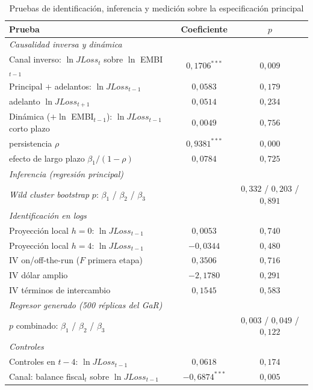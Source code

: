 \begin{table}[htbp]
\centering
\footnotesize
\caption[Pruebas de identificación, inferencia y medición]{Pruebas de identificación, inferencia y medición sobre la especificación principal}
\label{tab:arbitro}
\begin{tabular}{lcc}
\toprule
Prueba & Coeficiente & $p$ \\
\midrule
\multicolumn{3}{l}{\textit{Causalidad inversa y dinámica}} \\
Canal inverso: $\ln JLoss_t$ sobre $\ln$ EMBI$_{t-1}$ & $0{,}1706^{***}$ & $0{,}009$ \\
Principal $+$ adelantos: $\ln JLoss_{t-1}$ & $0{,}0583$ & $0{,}179$ \\
\quad adelanto $\ln JLoss_{t+1}$ & $0{,}0514$ & $0{,}234$ \\
Dinámica ($+\ln$ EMBI$_{t-1}$): $\ln JLoss_{t-1}$ corto plazo & $0{,}0049$ & $0{,}756$ \\
\quad persistencia $\rho$ & $0{,}9381^{***}$ & $0{,}000$ \\
\quad efecto de largo plazo $\beta_1/(1-\rho)$ & $0{,}0784$ & $0{,}725$ \\
\multicolumn{3}{l}{\textit{Inferencia (regresión principal)}} \\
\textit{Wild cluster bootstrap} $p$: $\beta_1$ / $\beta_2$ / $\beta_3$ & & $0{,}332$ / $0{,}203$ / $0{,}891$ \\
\multicolumn{3}{l}{\textit{Identificación en logs}} \\
Proyección local $h=0$: $\ln JLoss_{t-1}$ & $0{,}0053$ & $0{,}740$ \\
Proyección local $h=4$: $\ln JLoss_{t-1}$ & $-0{,}0344$ & $0{,}480$ \\
IV on/off-the-run ($F$ primera etapa) & $0{,}3506$ \;[$F=9{,}4$] & $0{,}716$ \\
IV dólar amplio & $-2{,}1780$ \;[$F=11{,}0$] & $0{,}291$ \\
IV términos de intercambio & $0{,}1545$ \;[$F=10{,}2$] & $0{,}583$ \\
\multicolumn{3}{l}{\textit{Regresor generado (500 réplicas del GaR)}} \\
$p$ combinado: $\beta_1$ / $\beta_2$ / $\beta_3$ & & $0{,}003$ / $0{,}049$ / $0{,}122$ \\
\multicolumn{3}{l}{\textit{Controles}} \\
Controles en $t-4$: $\ln JLoss_{t-1}$ & $0{,}0618$ & $0{,}174$ \\
Canal: balance fiscal$_t$ sobre $\ln JLoss_{t-1}$ & $-0{,}6874^{***}$ & $0{,}005$ \\

\end{tabular}
\end{table}
